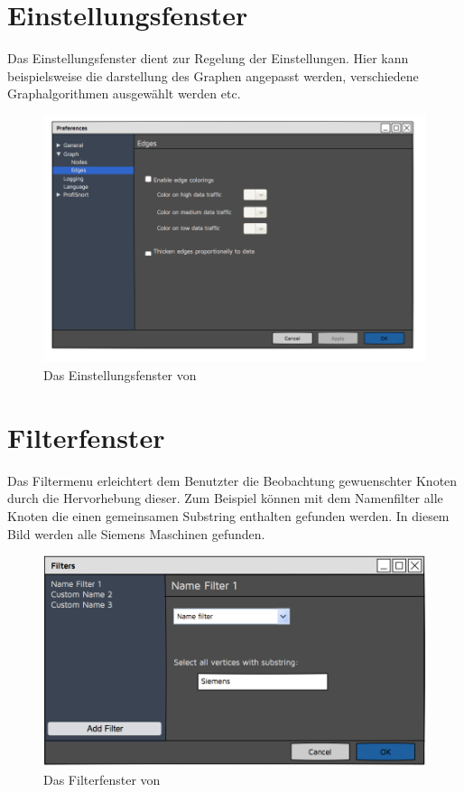 \section{Einstellungsfenster}
Das Einstellungsfenster dient zur Regelung der Einstellungen. Hier kann
beispielsweise die darstellung des Graphen angepasst werden, verschiedene
Graphalgorithmen ausgewählt werden etc.

\begin{figure}[h!]
  \includegraphics[scale=0.45]{./img/Preferences.png}
  \caption{Das Einstellungsfenster von \programname}
\end{figure}

\newpage
\section{Filterfenster}
Das Filtermenu erleichtert dem Benutzter die Beobachtung gewuenschter Knoten
durch die Hervorhebung dieser. Zum Beispiel können mit dem Namenfilter alle
Knoten die einen gemeinsamen Substring enthalten gefunden werden. In diesem
Bild werden alle Siemens Maschinen gefunden.

\begin{figure}[h!]
  \includegraphics[scale=0.45]{./img/Filters.png}
  \caption{Das Filterfenster von \programname}
\end{figure}
